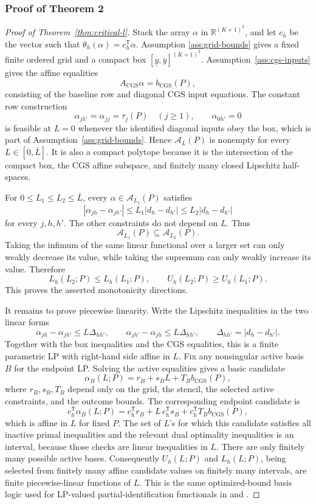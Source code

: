 \documentclass[11pt]{article}
\newcommand{\transpose}{\mathsf{T}}
\newcommand{\R}{\mathbb{R}}
\theoremstyle{definition}
\theoremstyle{plain}
\theoremstyle{remark}
\begin{document}
\subsubsection*{Proof of Theorem 2}
\begin{proof}[Proof of Theorem~\ref{thm:critical-l}]
Stack the array \(\alpha\) in \(\R^{(K+1)^2}\), and let \(c_h\) be the vector
such that \(\theta_h(\alpha)=c_h^\transpose\alpha\).  Assumption
\ref{ass:grid-bounds} gives a fixed finite ordered grid and a compact box
\([\underline y,\overline y]^{(K+1)^2}\).  Assumption~\ref{ass:cgs-inputs}
gives the affine equalities
\[
  A_{\mathrm{CGS}}\alpha=b_{\mathrm{CGS}}(P),
\]
consisting of the baseline row and diagonal CGS input equations.  The constant
row construction
\[
  \alpha_{j h'}=\alpha_{j j}=\tau_j(P)\quad(j\ge1),\qquad
  \alpha_{0 h'}=0
\]
is feasible at \(L=0\) whenever the identified diagonal inputs obey the box,
which is part of Assumption~\ref{ass:grid-bounds}.  Hence
\(\mathcal A_L(P)\) is nonempty for every \(L\in[0,\bar L]\).  It is also a
compact polytope because it is the intersection of the compact box, the CGS
affine subspace, and finitely many closed Lipschitz half-spaces.

For \(0\le L_1\le L_2\le\bar L\), every \(\alpha\in\mathcal A_{L_1}(P)\)
satisfies
\[
  |\alpha_{j h}-\alpha_{j h'}|
  \le L_1|d_h-d_{h'}|
  \le L_2|d_h-d_{h'}|
\]
for every \(j,h,h'\).  The other constraints do not depend on \(L\).  Thus
\[
  \mathcal A_{L_1}(P)\subseteq\mathcal A_{L_2}(P).
\]
Taking the infimum of the same linear functional over a larger set can only
weakly decrease its value, while taking the supremum can only weakly increase
its value.  Therefore
\[
  L_h(L_2;P)\le L_h(L_1;P),
  \qquad
  U_h(L_2;P)\ge U_h(L_1;P).
\]
This proves the asserted monotonicity directions.

It remains to prove piecewise linearity.  Write the Lipschitz inequalities in
the two linear forms
\[
  \alpha_{j h}-\alpha_{j h'}\le L\Delta_{hh'},
  \qquad
  \alpha_{j h'}-\alpha_{j h}\le L\Delta_{hh'},
  \qquad
  \Delta_{hh'}=|d_h-d_{h'}|.
\]
Together with the box inequalities and the CGS equalities, this is a finite
parametric LP with right-hand side affine in \(L\).  Fix any nonsingular active
basis \(B\) for the endpoint LP.  Solving the active equalities gives a basic
candidate
\[
  \alpha_B(L;P)=r_B+s_B L+T_B b_{\mathrm{CGS}}(P),
\]
where \(r_B,s_B,T_B\) depend only on the grid, the stencil, the selected active
constraints, and the outcome bounds.  The corresponding endpoint candidate is
\[
  c_h^\transpose\alpha_B(L;P)
  =c_h^\transpose r_B+L\,c_h^\transpose s_B
   +c_h^\transpose T_B b_{\mathrm{CGS}}(P),
\]
which is affine in \(L\) for fixed \(P\).  The set of \(L\)'s for which this
candidate satisfies all inactive primal inequalities and the relevant dual
optimality inequalities is an interval, because those checks are linear
inequalities in \(L\).  There are only finitely many possible active bases.
Consequently \(U_h(L;P)\) and \(L_h(L;P)\), being selected from finitely many
affine candidate values on finitely many intervals, are finite piecewise-linear
functions of \(L\).  This is the same optimized-bound basis logic used for
LP-valued partial-identification functionals in \cite{ChernozhukovLeeRosen2013}
and \cite{Voronin2025}.


\end{proof}
\end{document}
